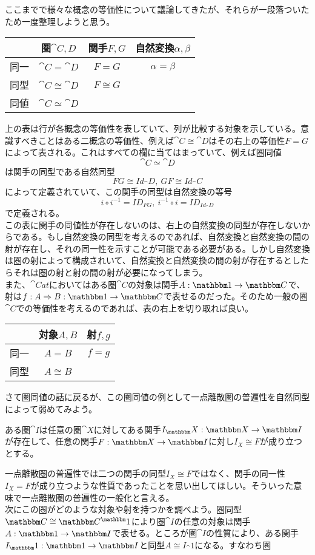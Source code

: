   ここまでで様々な概念の等価性について議論してきたが、それらが一段落ついたため一度整理しようと思う。
  \begin{table}[htb]
    \centering
      \begin{tabular}{|c||c|c|c|}  \hline
      &圏$\cat{C,D}$&関手$F,G$&自然変換$\alpha,\beta$\\ \hline \hline
      同一&$\cat{C}=\cat{D}$&$F=G$&$\alpha=\beta$\\ \hline
      同型&$\cat{C}\cong\cat{D}$&$F\cong G$&\\ \hline
      同値&$\cat{C}\simeq\cat{D}$&&\\ \hline
    \end{tabular}
  \end{table}
  上の表は行が各概念の等価性を表していて、列が比較する対象を示している。意識すべきことはある二概念の等価性、例えば$\cat{C}\cong \cat{D}$はその右上の等価性$F=G$によって表される。これはすべての欄に当てはまっていて、例えば圏同値\[\cat{C}\simeq\cat{D}\]は関手の同型である自然同型\[FG\cong Id_\cat{D},\ GF\cong Id_\cat{C}\]によって定義されていて、この関手の同型は自然変換の等号\[i\circ i^{-1}=ID_{FG},\ i^{-1}\circ i=ID_{Id_\cat{D}}\]で定義される。\\
  この表に関手の同値性が存在しないのは、右上の自然変換の同型が存在しないからである。もし自然変換の同型を考えるのであれば、自然変換と自然変換の間の射が存在し、それの同一性を示すことが可能である必要がある。しかし自然変換は圏の射によって構成されいて、自然変換と自然変換の間の射が存在するとしたらそれは圏の射と射の間の射が必要になってしまう。\\
  また、$\cat{Cat}$においてはある圏$\cat{C}$の対象は関手$\functor{A}{1}{C}$で、射は$\natf{f}{A}{B}{1}{C}$で表せるのだった。そのため一般の圏$\cat{C}$での等価性を考えるのであれば、表の右上を切り取れば良い。
  \begin{table}[htb]
    \centering
      \begin{tabular}{|c||c|c|}  \hline
      &対象$A,B$&射$f,g$\\ \hline \hline
      同一&$A=B$&$f=g$\\ \hline
      同型&$A\cong B$&\\ \hline
    \end{tabular}
  \end{table}

  さて圏同値の話に戻るが、この圏同値の例として一点離散圏の普遍性を自然同型によって弱めてみよう。
  \begin{define}
    ある圏$\cat{I}$は任意の圏$\cat{X}$に対してある関手$\functor{I_\cat{X}}{X}{I}$が存在して、任意の関手$\functor{F}{X}{I}$に対し$I_X\cong F$が成り立つとする。
  \end{define}
  一点離散圏の普遍性では二つの関手の同型$I_X\cong F$ではなく、関手の同一性$I_X=F$が成り立つような性質であったことを思い出してほしい。そういった意味で一点離散圏の普遍性の一般化と言える。\\
  次にこの圏がどのような対象や射を持つかを調べよう。圏同型$\cat{C}\cong\funccat{1}{C}$により圏$\cat{I}$の任意の対象は関手$\functor{A}{1}{I}$で表せる。ところが圏$\cat{I}$の性質により、ある関手$\functor{I_\cat{1}}{1}{I}$と同型$A\cong I_\cat{1}$になる。すなわち圏